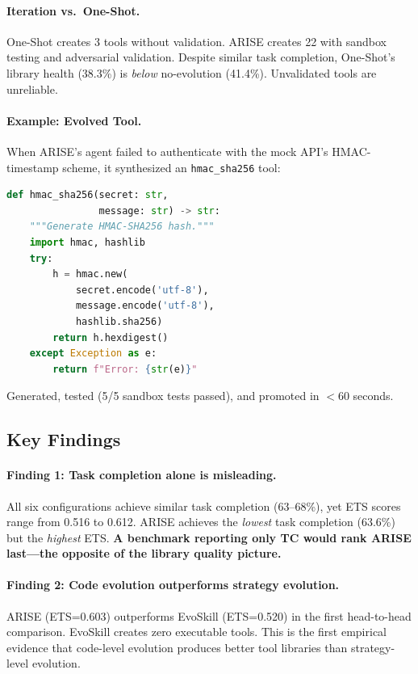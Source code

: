 \documentclass[]{ceurart}
\begin{document}
\paragraph{Iteration vs.\ One-Shot.} One-Shot creates 3 tools without validation. ARISE creates 22 with sandbox testing and adversarial validation. Despite similar task completion, One-Shot's library health (38.3\%) is \emph{below} no-evolution (41.4\%). Unvalidated tools are unreliable.

\paragraph{Example: Evolved Tool.} When ARISE's agent failed to authenticate with the mock API's HMAC-timestamp scheme, it synthesized an \texttt{hmac\_sha256} tool:

\begin{lstlisting}[language=Python, basicstyle=\small\ttfamily]
def hmac_sha256(secret: str,
                message: str) -> str:
    """Generate HMAC-SHA256 hash."""
    import hmac, hashlib
    try:
        h = hmac.new(
            secret.encode('utf-8'),
            message.encode('utf-8'),
            hashlib.sha256)
        return h.hexdigest()
    except Exception as e:
        return f"Error: {str(e)}"
\end{lstlisting}

Generated, tested (5/5 sandbox tests passed), and promoted in $<$60 seconds.

\subsection{Key Findings}

\paragraph{Finding 1: Task completion alone is misleading.} All six configurations achieve similar task completion (63--68\%), yet ETS scores range from 0.516 to 0.612. ARISE achieves the \emph{lowest} task completion (63.6\%) but the \emph{highest} ETS. \textbf{A benchmark reporting only TC would rank ARISE last---the opposite of the library quality picture.}

\paragraph{Finding 2: Code evolution outperforms strategy evolution.} ARISE (ETS=0.603) outperforms EvoSkill (ETS=0.520) in the first head-to-head comparison. EvoSkill creates zero executable tools. This is the first empirical evidence that code-level evolution produces better tool libraries than strategy-level evolution.
\end{document}
